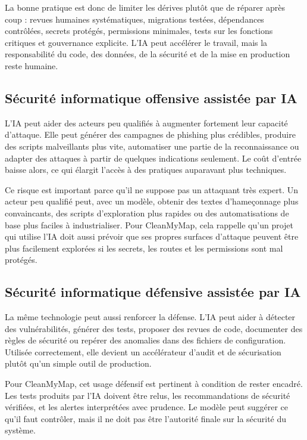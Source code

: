\documentclass[
  10pt,
  a4paper,
  DIV=11,
  numbers=noendperiod,
  oneside]{scrreprt}
\begin{document}
La bonne pratique est donc de limiter les dérives plutôt que de réparer
après coup : revues humaines systématiques, migrations testées,
dépendances contrôlées, secrets protégés, permissions minimales, tests
sur les fonctions critiques et gouvernance explicite. L'IA peut
accélérer le travail, mais la responsabilité du code, des données, de la
sécurité et de la mise en production reste humaine.

\subsection{Sécurité informatique offensive assistée par
IA}\label{suxe9curituxe9-informatique-offensive-assistuxe9e-par-ia}

L'IA peut aider des acteurs peu qualifiés à augmenter fortement leur
capacité d'attaque. Elle peut générer des campagnes de phishing plus
crédibles, produire des scripts malveillants plus vite, automatiser une
partie de la reconnaissance ou adapter des attaques à partir de quelques
indications seulement. Le coût d'entrée baisse alors, ce qui élargit
l'accès à des pratiques auparavant plus techniques.

Ce risque est important parce qu'il ne suppose pas un attaquant très
expert. Un acteur peu qualifié peut, avec un modèle, obtenir des textes
d'hameçonnage plus convaincants, des scripts d'exploration plus rapides
ou des automatisations de base plus faciles à industrialiser. Pour
CleanMyMap, cela rappelle qu'un projet qui utilise l'IA doit aussi
prévoir que ses propres surfaces d'attaque peuvent être plus facilement
explorées si les secrets, les routes et les permissions sont mal
protégés.

\subsection{Sécurité informatique défensive assistée par
IA}\label{suxe9curituxe9-informatique-duxe9fensive-assistuxe9e-par-ia}

La même technologie peut aussi renforcer la défense. L'IA peut aider à
détecter des vulnérabilités, générer des tests, proposer des revues de
code, documenter des règles de sécurité ou repérer des anomalies dans
des fichiers de configuration. Utilisée correctement, elle devient un
accélérateur d'audit et de sécurisation plutôt qu'un simple outil de
production.

Pour CleanMyMap, cet usage défensif est pertinent à condition de rester
encadré. Les tests produits par l'IA doivent être relus, les
recommandations de sécurité vérifiées, et les alertes interprétées avec
prudence. Le modèle peut suggérer ce qu'il faut contrôler, mais il ne
doit pas être l'autorité finale sur la sécurité du système.
\end{document}
